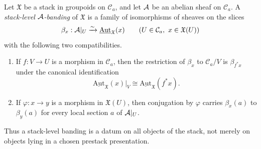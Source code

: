 \begin{definition}\label{def:stack-level-banding}
Let $\mathfrak X$ be a stack in groupoids on $\mathcal C_a$, and let $\mathcal{A}$ be
an abelian sheaf on $\mathcal C_a$. A \emph{stack-level $\mathcal{A}$-banding} of
$\mathfrak X$ is a family of isomorphisms of sheaves on the slices
\[
\beta_x:\mathcal{A}|_U\xrightarrow{\sim}
\underline{\mathrm{Aut}}_{\mathfrak X}(x)
\qquad (U\in\mathcal C_a,\ x\in\mathfrak X(U))
\]
with the following two compatibilities.
\begin{enumerate}[label=(\roman*),nosep]
\item If $f:V\to U$ is a morphism in $\mathcal C_a$, then the restriction of
$\beta_x$ to $\mathcal C_a/V$ is $\beta_{f^*x}$ under the canonical
identification
\[
\underline{\mathrm{Aut}}_{\mathfrak X}(x)|_V
\cong
\underline{\mathrm{Aut}}_{\mathfrak X}(f^*x).
\]
\item If $\varphi:x\to y$ is a morphism in $\mathfrak X(U)$, then conjugation by
$\varphi$ carries $\beta_x(a)$ to $\beta_y(a)$ for every local section $a$ of
$\mathcal{A}|_U$.
\end{enumerate}
Thus a stack-level banding is a datum on all objects of the stack, not merely on
objects lying in a chosen prestack presentation.
\end{definition}

